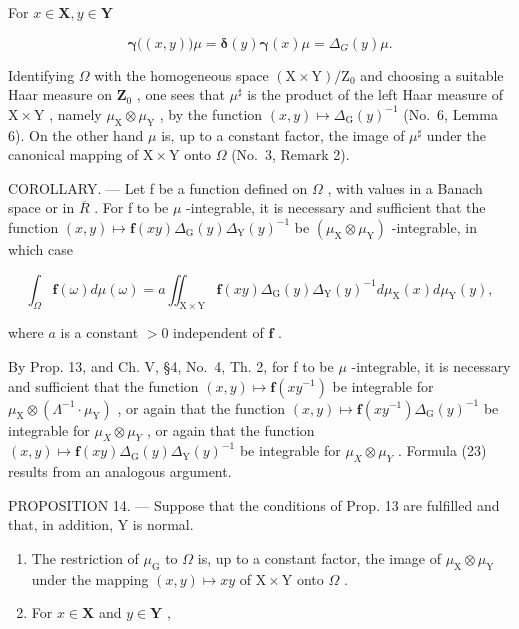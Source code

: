 For \(x\in \mathbf{X},y\in \mathbf{Y}\)

\[
\boldsymbol {\gamma} \big ((x, y) \big) \mu = \boldsymbol {\delta} (y) \boldsymbol {\gamma} (x) \mu = \Delta_ {G} (y) \mu .
\]

Identifying \(\Omega\) with the homogeneous space \((\mathrm{X} \times \mathrm{Y}) / \mathrm{Z}_0\) and choosing a suitable Haar measure on \(\mathbf{Z}_0\) , one sees that \(\mu^\sharp\) is the product of the left Haar measure of \(\mathrm{X} \times \mathrm{Y}\) , namely \(\mu_{\mathrm{X}} \otimes \mu_{\mathrm{Y}}\) , by the function \((x, y) \mapsto \Delta_{\mathrm{G}}(y)^{-1}\) (No.~6, Lemma 6). On the other hand \(\mu\) is, up to a constant factor, the image of \(\mu^\sharp\) under the canonical mapping of \(\mathrm{X} \times \mathrm{Y}\) onto \(\Omega\) (No.~3, Remark 2).

COROLLARY. --- Let f be a function defined on \(\Omega\) , with values in a Banach space or in \(\overline{R}\) . For f to be \(\mu\) -integrable, it is necessary and sufficient that the function \((x,y)\mapsto\mathbf{f}(xy)\Delta_{\mathrm{G}}(y)\Delta_{\mathrm{Y}}(y)^{-1}\) be \((\mu_{\mathrm{X}}\otimes\mu_{\mathrm{Y}})\) -integrable, in which case

\[
\int_ {\Omega} \mathbf {f} (\omega) d \mu (\omega) = a \iint_ {\mathrm{X} \times \mathrm{Y}} \mathbf {f} (x y) \Delta_ {\mathrm{G}} (y) \Delta_ {\mathrm{Y}} (y) ^ {- 1} d \mu_ {\mathrm{X}} (x) d \mu_ {\mathrm{Y}} (y),\tag{23}
\]

where \(a\) is a constant \(>0\) independent of \(\mathbf{f}\) .

By Prop. 13, and Ch. V, §4, No.~4, Th. 2, for f to be \(\mu\) -integrable, it is necessary and sufficient that the function \((x,y)\mapsto\mathbf{f}(xy^{-1})\) be integrable for \(\mu_{\mathrm{X}}\otimes(\Lambda^{-1}\cdot\mu_{\mathrm{Y}})\) , or again that the function \((x,y)\mapsto\mathbf{f}(xy^{-1})\Delta_{\mathrm{G}}(y)^{-1}\) be integrable for \(\mu_{X}\otimes\mu_{Y}\) , or again that the function \((x,y)\mapsto\mathbf{f}(xy)\Delta_{\mathrm{G}}(y)\Delta_{\mathrm{Y}}(y)^{-1}\) be integrable for \(\mu_{X}\otimes\mu_{Y}\) . Formula (23) results from an analogous argument.

PROPOSITION 14. --- Suppose that the conditions of Prop. 13 are fulfilled and that, in addition, Y is normal.

\begin{enumerate}
\def\labelenumi{\alph{enumi})}
\item
  The restriction of \(\mu_{\mathrm{G}}\) to \(\Omega\) is, up to a constant factor, the image of \(\mu_{\mathrm{X}} \otimes \mu_{\mathrm{Y}}\) under the mapping \((x,y) \mapsto xy\) of \(\mathrm{X} \times \mathrm{Y}\) onto \(\Omega\) .
\item
  For \(x \in \mathbf{X}\) and \(y \in \mathbf{Y}\) ,
\end{enumerate}

